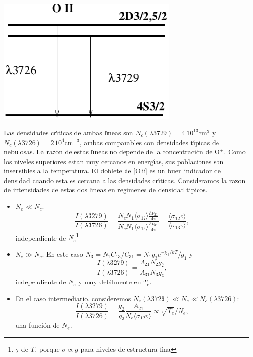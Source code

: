 \begin{floatingfigure}{12cm}
\includegraphics[width=9cm,height=!]{oii.pdf}
\end{floatingfigure}  \quad  Las densidades cr\'{\i}ticas de ambas
l\'{\i}neas son $N_c(\lambda3729) = 4\,10^{13}$cm$^{3}$ y
$N_c(\lambda3726) = 2\,10^{4}$cm$^{-3}$, ambas comparables con
densidades t\'{\i}picas de nebulosas. La raz\'on de estas l\'{\i}neas
no depende de la concentraci\'on de O$^+$.  Como los niveles
superiores estan muy cercanos en energ\'{\i}as, sus poblaciones son
insensibles a la temperatura. El doblete de [O\,{\sc ii}] es un buen
indicador de densidad cuando esta es cercana a las densidades
cr\'{\i}ticas. Consideramos la razon de intensidades de estas dos
l\'{\i}neas en regimenes de densidad t\'{\i}picos.



\begin{itemize}
\item $N_e \ll N_c$. \[ \frac{I(\lambda 3279)}{I(\lambda 3726)} =\frac{ N_e
N_1  \langle \sigma_{12} \rangle \frac{h\nu_{21}}{4\pi}}{ N_e
N_1  \langle \sigma_{13} \rangle \frac{h\nu_{31}}{4\pi}} = \frac{ \langle
\sigma_{12} v  \rangle}{\langle \sigma_{13} v  \rangle},\] independiente de
$N_e$\footnote{y de $T_e$ porque $\sigma  \propto g$ para niveles de
estructura fina} 
\item $N_e \gg N_c$. En este caso $N_3 = N_1 C_{13}/C_{31} = N_1 g_3
e^{-\chi_3/kT} / g_1 $  y 
\[\frac{I(\lambda 3279)}{I(\lambda 3726)} = \frac{A_{21}
N_2 g_2 }{A_{31}N_3 g_3}, \] independiente de $N_e$ y muy debilmente
en $T_e$.
\item En el caso intermediario, consideremos $N_c(\lambda 3729) \ll N_c
\ll N_c(\lambda 3726)$:
\[\frac{I(\lambda 3279)}{I(\lambda 3726)} = \frac{g_2}{g_3}
\frac{A_{21}}{N_e \langle \sigma_{12} v \rangle} \propto \sqrt{T_e}/N_e,\]  una funci\'on de
$N_e$.
\end{itemize}

